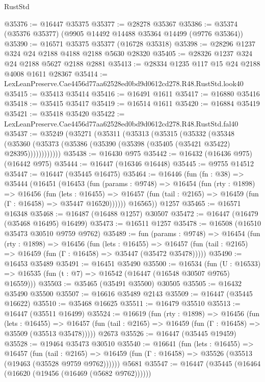 \begin{lexlean}{RustStd}
\begin{coremodule}
@35376 := @16447 @35375
@35377 := @28278 @35367
@35386 := @35374 (@35376 @35377) (@9905 @14492 @14488 @35364 @14499 (@9776 @35364))
@35390 := @16571 @35375 @35377 (@16728 @35318)
@35398 := @28296 @1237 @324 @24 @2188 @4188 @2188 @5630 @28320
@35405 := @28326 @1237 @324 @24 @2188 @5627 @2188 @2881
@35413 := @28334 @1235 @117 @15 @24 @2188 @4008 @1611 @28367
@35414 := LexLeanPreserve.Cae4456d77aa62528ed0bd9d0612cd278.R48.RustStd.look40
@35415 := @35413 @35414
@35416 := @16491 @1611
@35417 := @16880 @35416
@35418 := @35415 @35417
@35419 := @16514 @1611
@35420 := @16884 @35419
@35421 := @35418 @35420
@35422 := LexLeanPreserve.Cae4456d77aa62528ed0bd9d0612cd278.R48.RustStd.fal40
@35437 := @35249
    (@35271
      (@35311
        (@35313
          (@35315
            (@35332
              (@35348
                (@35360 (@35373 (@35386 (@35390 (@35398 (@35405 (@35421 @35422) @28395))))))))))))
@35438 := @16430 @975
@35442 := @16432 (@16436 @975) (@16442 @975)
@35444 := @16447 (@16346 @16448)
@35445 := @9755 @14512
@35447 := @16447 (@35445 @16475)
@35464 := @16446
    (fun (fn : @38) =>
    @35444
      (@16451
        (@16453
          (fun (params : @9748) =>
          @16454
            (fun (rty : @1898) =>
            @16456
              (fun (lets : @16455) =>
              @16457 (fun (tail : @2165) => @16459 (fun (Γ : @16458) => @35447 @16520))))))
        @16565))
    @1257
@35465 := @16571 @16348
@35468 := @16487 (@16488 @1257) @30507
@35472 := @16447 (@16479 (@35468 @16495) @16499)
@35473 := @16511 @1257
@35478 := @16508 (@16510 @35473 @30510 @9759 @9762)
@35489 := fun (params : @9748) =>
  @16454
    (fun (rty : @1898) =>
    @16456
      (fun (lets : @16455) =>
      @16457 (fun (tail : @2165) => @16459 (fun (Γ : @16458) => @35447 (@35472 @35478)))))
@35490 := @16453 @35489
@35491 := @16451 @35490
@35500 := @16534
    (fun (U : @16533) => @16535 (fun (t : @7) => @16542 (@16447 (@16548 @30507 @9765) @16559)))
@35503 := @35465 (@35491 @35500) @30505
@35505 := @16432 @35490 @35500
@35507 := @16616 @35489 @2143
@35509 := @16447 (@35445 @16622)
@35510 := @35468 @16625
@35511 := @16479 @35510
@35513 := @16447 (@35511 @16499)
@35524 := @16619
    (fun (rty : @1898) =>
    @16456
      (fun (lets : @16455) =>
      @16457 (fun (tail : @2165) => @16459 (fun (Γ : @16458) => @35509 (@35513 @35478)))))
    @2673
@35526 := @16447 (@35445 @19459)
@35528 := @19464 @35473 @30510
@35540 := @16641
    (fun (lets : @16455) =>
    @16457
      (fun (tail : @2165) =>
      @16459 (fun (Γ : @16458) => @35526 (@35513 (@19463 (@35528 @9759 @9762))))))
    @5681
@35547 := @16447 (@35445 (@16464 (@16620 (@19456 (@16469 (@5682 @9762))))))

\end{coremodule}
\end{lexlean}
